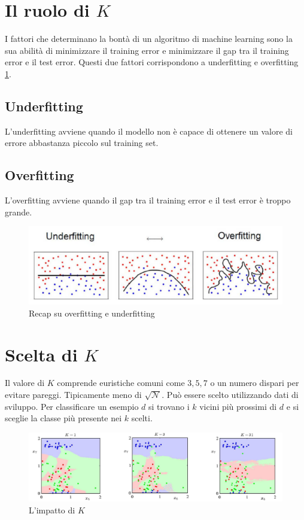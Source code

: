 \section{Il ruolo di $K$}
I fattori che determinano la bont\`a di un algoritmo di machine learning sono la sua abilit\`a di minimizzare il training error e minimizzare il gap tra il training error e il test error.
Questi due fattori corrispondono a underfitting e overfitting \ref{fig:chapter03-00}.

	\subsection{Underfitting}
	L'underfitting avviene quando il modello non \`e capace di ottenere un valore di errore abbastanza piccolo sul training set.
	
	\subsection{Overfitting}
	L'overfitting avviene quando il gap tra il training error e il test error \`e troppo grande.
	
	\begin{figure}
		\centering
		\includegraphics[width=0.6\linewidth]{imgs/chapter3/img1}
		\caption{Recap su overfitting e underfitting}
		\label{fig:chapter03-00}
	\end{figure}

\section{Scelta di $K$}
Il valore di $K$ comprende euristiche comuni come $3, 5, 7$ o un numero dispari per evitare pareggi. Tipicamente meno di $\sqrt{\mathcal{N}}$.
Pu\`o essere scelto utilizzando dati di sviluppo.
Per classificare un esempio $d$ si trovano i $k$ vicini pi\`u prossimi di $d$ e si sceglie la classe pi\`u presente nei $k$ scelti.

\begin{figure}
	\centering
	\includegraphics[width=0.6\linewidth]{imgs/chapter3/img0}
	\caption{L'impatto di $K$}
	\label{fig:chapter03-01}
\end{figure}

